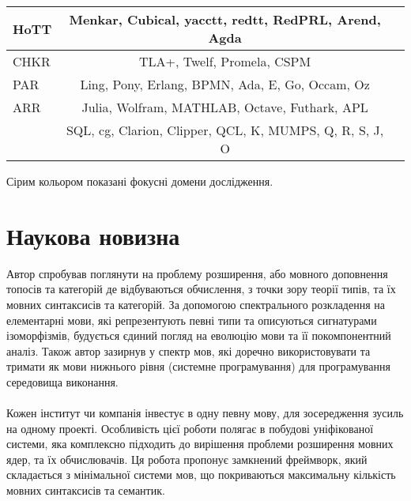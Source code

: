 \begin{table}
\begin{tabular}{lcc}
    \hline
\rowcolor{LightGray}
       HoTT & Menkar, Cubical, yacctt, redtt, RedPRL, Arend, Agda \\
    \hline
\rowcolor{LightGray25}
       CHKR & TLA+, Twelf, Promela, CSPM \\
    \hline
\rowcolor{LightGray}
       PAR & Ling, Pony, Erlang, BPMN, Ada, E, Go, Occam, Oz \\
    \hline
\rowcolor{LightGray}
       ARR & Julia, Wolfram, MATHLAB, Octave, Futhark, APL \\
\rowcolor{LightGray}
           & SQL, cg, Clarion, Clipper, QCL, K, MUMPS, Q, R, S, J, O \\
    \hline
  \end{tabular}
\small Сірим кольором показані фокусні домени дослідження.
\end{table}

\section{Наукова новизна}
Автор спробував поглянути на проблему розширення, або мовного доповнення
топосів та категорій де відбуваються обчислення, з точки зору теорії типів,
та їх мовних синтаксисів та категорій. За допомогою спектрального розкладення на
елементарні мови, які репрезентують певні типи та описуються сигнатурами ізоморфізмів,
будується єдиний погляд на еволюцію мови та її покомпонентний аналіз. Також автор
зазирнув у спектр мов, які доречно використовувати та тримати як мови нижнього
рівня (системне програмування) для програмування середовища виконання.

\paragraph{}
Кожен інститут чи компанія інвестує в одну певну мову, для зосередження зусиль на одному проекті.
Особливість цієї роботи полягає в побудові уніфікованої системи, яка комплексно підходить
до вирішення проблеми розширення мовних ядер, та їх обчислювачів. Ця робота
пропонує замкнений фреймворк, який складається з мінімальної системи мов,
що покриваються максимальну кількість мовних синтаксисів та семантик.

